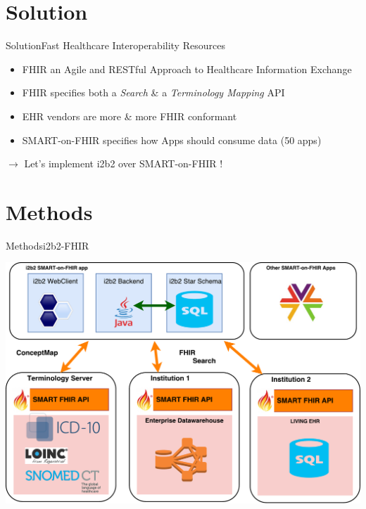 \documentclass[10pt]{beamer}
\begin{document}
\section{Solution}
\begin{frame}{Solution}{Fast Healthcare Interoperability Resources}

\begin{itemize}
\item FHIR an Agile and RESTful Approach to Healthcare Information Exchange
\item FHIR specifies both a \emph{Search} \& a \emph{Terminology Mapping} API
\item EHR vendors are more \& more FHIR conformant
\item SMART-on-FHIR specifies how Apps should consume data (50 apps)
\end{itemize}
$\rightarrow$ Let's implement i2b2 over SMART-on-FHIR !
\end{frame}

\section{Methods}
\begin{frame}{Methods}{i2b2-FHIR}

\includegraphics[height=.8\textheight]{images/overall.pdf}
\end{frame}

\end{document}
